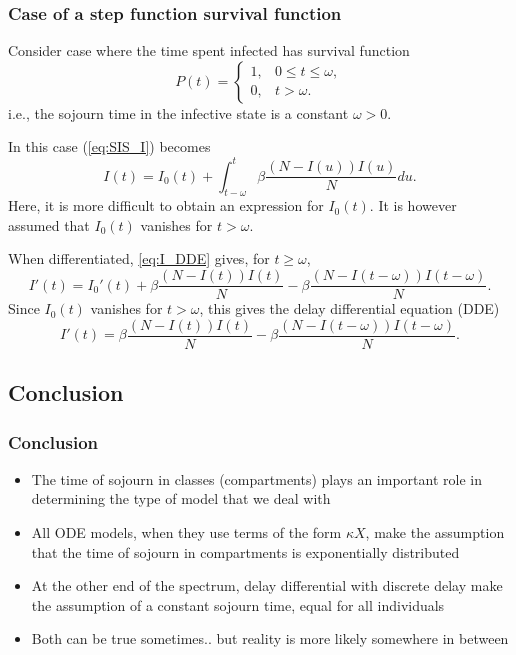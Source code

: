\documentclass[aspectratio=169]{beamer}
\begin{document}
\begin{frame}\frametitle{Case of a step function survival function}
Consider case where the time spent infected has survival function 
\[
P(t)=\begin{cases}
1, & 0\leq t\leq\omega,\\
0, & t>\omega.
\end{cases}
\]
i.e., the sojourn time in the infective state is a constant
$\omega>0$.
 
In this case (\ref{eq:SIS_I}) becomes
\begin{equation}\label{eq:I_DDE}
I(t)=I_0(t)+\int_{t-\omega}^t \beta\frac{(N-I(u))I(u)}{N} du.
\end{equation}
Here, it is more difficult to obtain an expression for $I_0(t)$. It is however
assumed that $I_0(t)$ vanishes for $t>\omega$.
\end{frame}

\begin{frame}
When differentiated, \eqref{eq:I_DDE} gives, for $t\geq\omega$,
\[
I'(t)=I_0'(t)+\beta\frac{(N-I(t))I(t)}{N}
-\beta\frac{\left(N-I(t-\omega)\right)I(t-\omega)}{N}.
\]
Since $I_0(t)$ vanishes for $t>\omega$, this gives the delay
differential equation (DDE)
\[
I'(t)=\beta\frac{(N-I(t))I(t)}{N}
-\beta\frac{(N-I(t-\omega))I(t-\omega)}{N}.
\]
\end{frame}




\subsection{Conclusion}

\begin{frame}\frametitle{Conclusion}
\begin{itemize}
\item The time of sojourn in classes (compartments) plays an important role in determining the type of model that we deal with
\vfill
\item All ODE models, when they use terms of the form $\kappa X$, make the assumption that the time of sojourn in compartments is exponentially distributed
\vfill
\item At the other end of the spectrum, delay differential with discrete delay make the assumption of a constant sojourn time, equal for all individuals
\vfill
\item Both can be true sometimes.. but reality is more likely somewhere in between
\end{itemize}
\end{frame}
\end{document}
